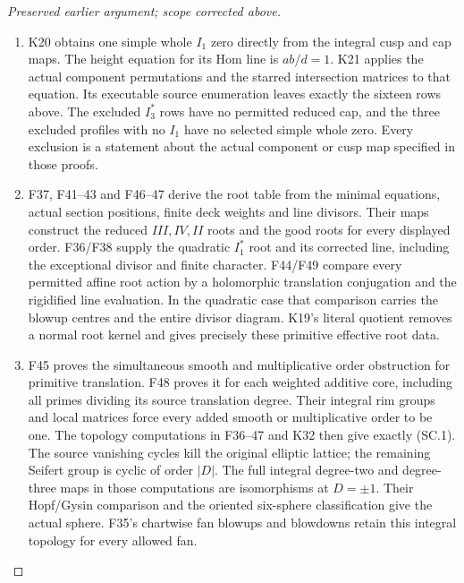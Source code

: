 \begin{proof}[Preserved earlier argument; scope corrected above]
\begin{enumerate}[label=\arabic*.]
\par

\medskip\noindent\textbf{C3. Necessity and construction through exact maps}

\par\nobreak

\item K20 obtains one simple whole \(I_1\) zero directly from
the integral cusp and cap maps. The height equation
for its Hom line is \(ab/d=1\). K21 applies the actual
component permutations and the starred intersection
matrices to that equation. Its executable source
enumeration leaves exactly the sixteen rows above.
The excluded \(I_3^*\) rows have no permitted reduced
cap, and the three excluded profiles with no \(I_1\)
have no selected simple whole zero. Every exclusion
is a statement about the actual component or cusp
map specified in those proofs.

\item F37, F41--43 and F46--47 derive the root table from
the minimal equations, actual section positions,
finite deck weights and line divisors. Their maps
construct the reduced \(III,IV,II\) roots and the
good roots for every displayed order. F36/F38 supply
the quadratic \(I_1^*\) root and its corrected
line, including the exceptional divisor and
finite character. F44/F49 compare every permitted
affine root action by a holomorphic translation
conjugation and the rigidified line evaluation.
In the quadratic case that comparison carries
the blowup centres and the entire divisor diagram.
K19's literal quotient removes a normal root
kernel and gives precisely these primitive
effective root data.

\item F45 proves the simultaneous smooth and multiplicative
order obstruction for primitive translation. F48
proves it for each weighted additive core, including
all primes dividing its source translation degree.
Their integral rim groups and local matrices force
every added smooth or multiplicative order to be one.
The topology computations in F36--47 and K32 then
give exactly (SC.1). The source vanishing cycles
kill the original elliptic lattice; the remaining
Seifert group is cyclic of order \(|D|\).
The full integral degree-two and degree-three maps
in those computations are isomorphisms at
\(D=\pm1\). Their Hopf/Gysin comparison and the
oriented six-sphere classification give the
actual sphere. F35's chartwise fan blowups and
blowdowns retain this integral topology for
every allowed fan.


\end{enumerate}
\end{proof}

